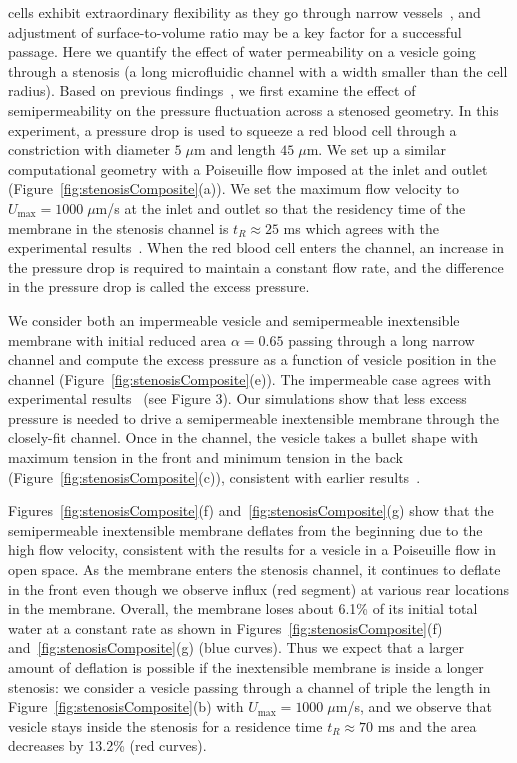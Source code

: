 \documentclass[prb,preprint,showpacs,preprintnumbers,amsmath,amssymb,longbibliography]{revtex4-1}
\begin{document}
cells exhibit extraordinary flexibility as they go through narrow
vessels~\cite{AuStoreyMoore2016_PNAS}, and adjustment of
surface-to-volume ratio may be a key factor for a successful passage.
Here we quantify the effect of water permeability on a vesicle going
through a stenosis (a long microfluidic channel with a width smaller
than the cell radius). Based on previous
findings~\cite{abk-fai-sto2006}, we first examine the effect of
semipermeability on the pressure fluctuation across a stenosed geometry.
In this experiment, a pressure drop is used to squeeze a red blood cell
through a constriction with diameter $5\;\mu$m and length $45\;\mu$m. We
set up a similar computational geometry with a Poiseuille flow imposed
at the inlet and outlet (Figure~\ref{fig:stenosisComposite}(a)). We set
the maximum flow velocity to $U_{\max} = 1000 \;\mu$m/s at the inlet and
outlet so that the residency time of the membrane in the stenosis channel
is $t_R \approx 25$ ms which agrees with the experimental
results~\cite{abk-fai-sto2006}. When the red blood cell enters the
channel, an increase in the pressure drop is required to maintain a
constant flow rate, and the difference in the pressure drop is called
the excess pressure.

We consider both an impermeable vesicle and semipermeable inextensible membrane with initial
reduced area $\alpha = 0.65$ passing through a long narrow channel and
compute the excess pressure as a function of vesicle position in the
channel (Figure~\ref{fig:stenosisComposite}(e)). The impermeable case
agrees with experimental results~\cite{abk-fai-sto2006} (see Figure 3).
Our simulations show that less excess pressure is needed to drive a
semipermeable inextensible membrane through the closely-fit channel. Once in the
channel, the vesicle takes a bullet shape with maximum tension in the
front and minimum tension in the back
(Figure~\ref{fig:stenosisComposite}(c)), consistent with earlier
results~\cite{Pak2015_PNAS, HarmanBertrandJoos2017_CJP}.

Figures~\ref{fig:stenosisComposite}(f)
and~\ref{fig:stenosisComposite}(g) show that the semipermeable inextensible membrane deflates from
the beginning due to the high flow velocity, consistent with the results
for a vesicle in a Poiseuille flow in open space. As the membrane enters
the stenosis channel, it continues to deflate in the front even though
we observe influx (red segment) at various rear locations in the
membrane. Overall, the membrane loses about 6.1\% of its initial total
water at a constant rate as shown in
Figures~\ref{fig:stenosisComposite}(f)
and~\ref{fig:stenosisComposite}(g) (blue curves). Thus we expect that a
larger amount of deflation is possible if the inextensible membrane is inside a longer
stenosis: we consider a vesicle passing through a channel of triple the
length in Figure~\ref{fig:stenosisComposite}(b) with
$U_{\max}=1000\;\mu$m/s, and we observe that vesicle stays inside the
stenosis for a residence time $t_R \approx 70$ ms and the area decreases
by 13.2\% (red curves).
\end{document}

